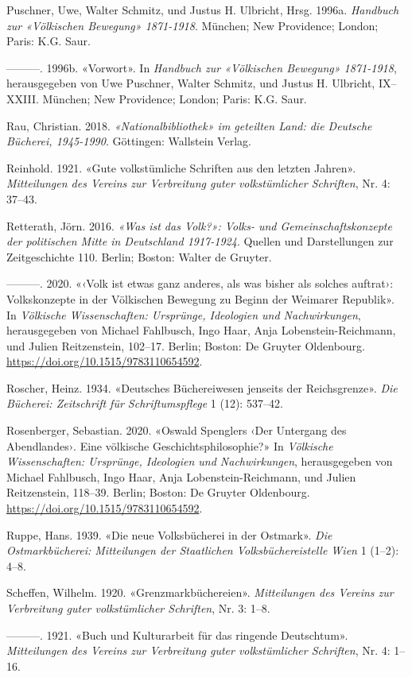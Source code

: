 \documentclass[a4paper,
fontsize=11pt,
oneside,
numbers=noperiodatend,
parskip=half-,
bibliography=totoc,
final
]{scrartcl}
\begin{document}
Puschner, Uwe, Walter Schmitz, und Justus H. Ulbricht, Hrsg. 1996a.
\emph{Handbuch zur «Völkischen Bewegung» 1871-1918}. München; New
Providence; London; Paris: K.G. Saur.

---------. 1996b. «Vorwort». In \emph{Handbuch zur «Völkischen Bewegung»
1871-1918}, herausgegeben von Uwe Puschner, Walter Schmitz, und Justus
H. Ulbricht, IX--XXIII. München; New Providence; London; Paris: K.G.
Saur.

Rau, Christian. 2018. \emph{«Nationalbibliothek» im geteilten Land: die
Deutsche Bücherei, 1945-1990}. Göttingen: Wallstein Verlag.

Reinhold. 1921. «Gute volkstümliche Schriften aus den letzten Jahren».
\emph{Mitteilungen des Vereins zur Verbreitung guter volkstümlicher
Schriften}, Nr. 4: 37--43.

Retterath, Jörn. 2016. \emph{«Was ist das Volk?»: Volks- und
Gemeinschaftskonzepte der politischen Mitte in Deutschland 1917-1924}.
Quellen und Darstellungen zur Zeitgeschichte 110. Berlin; Boston: Walter
de Gruyter.

---------. 2020. «‹Volk ist etwas ganz anderes, als was bisher als
solches auftrat›: Volkskonzepte in der Völkischen Bewegung zu Beginn der
Weimarer Republik». In \emph{Völkische Wissenschaften: Ursprünge,
Ideologien und Nachwirkungen}, herausgegeben von Michael Fahlbusch, Ingo
Haar, Anja Lobenstein-Reichmann, und Julien Reitzenstein, 102--17.
Berlin; Boston: De Gruyter Oldenbourg.
\url{https://doi.org/10.1515/9783110654592}.

Roscher, Heinz. 1934. «Deutsches Büchereiwesen jenseits der
Reichsgrenze». \emph{Die Bücherei: Zeitschrift für Schriftumspflege} 1
(12): 537--42.

Rosenberger, Sebastian. 2020. «Oswald Spenglers ‹Der Untergang des
Abendlandes›. Eine völkische Geschichtsphilosophie?» In \emph{Völkische
Wissenschaften: Ursprünge, Ideologien und Nachwirkungen}, herausgegeben
von Michael Fahlbusch, Ingo Haar, Anja Lobenstein-Reichmann, und Julien
Reitzenstein, 118--39. Berlin; Boston: De Gruyter Oldenbourg.
\url{https://doi.org/10.1515/9783110654592}.

Ruppe, Hans. 1939. «Die neue Volksbücherei in der Ostmark». \emph{Die
Ostmarkbücherei: Mitteilungen der Staatlichen Volksbüchereistelle Wien}
1 (1--2): 4--8.

Scheffen, Wilhelm. 1920. «Grenzmarkbüchereien». \emph{Mitteilungen des
Vereins zur Verbreitung guter volkstümlicher Schriften}, Nr. 3: 1--8.

---------. 1921. «Buch und Kulturarbeit für das ringende Deutschtum».
\emph{Mitteilungen des Vereins zur Verbreitung guter volkstümlicher
Schriften}, Nr. 4: 1--16.
\end{document}
